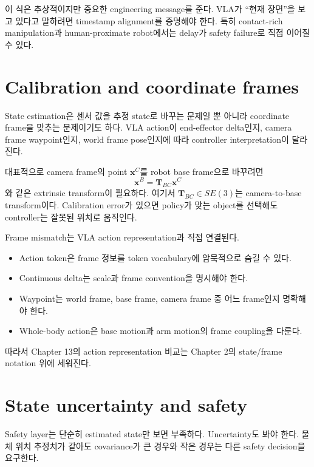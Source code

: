 이 식은 추상적이지만 중요한 engineering message를 준다. VLA가 ``현재 장면''을 보고 있다고 말하려면 timestamp alignment를 증명해야 한다. 특히 contact-rich manipulation과 human-proximate robot에서는 delay가 safety failure로 직접 이어질 수 있다.

\section{Calibration and coordinate frames}

State estimation은 센서 값을 추정 state로 바꾸는 문제일 뿐 아니라 coordinate frame을 맞추는 문제이기도 하다. VLA action이 end-effector delta인지, camera frame waypoint인지, world frame pose인지에 따라 controller interpretation이 달라진다.

대표적으로 camera frame의 point $\bm{x}^{C}$를 robot base frame으로 바꾸려면
\begin{equation}
  \bm{x}^{B} = \bm{T}_{BC}\bm{x}^{C}
  \label{eq:frame-transform}
\end{equation}
와 같은 extrinsic transform이 필요하다. 여기서 $\bm{T}_{BC}\in SE(3)$는 camera-to-base transform이다. Calibration error가 있으면 policy가 맞는 object를 선택해도 controller는 잘못된 위치로 움직인다.

Frame mismatch는 VLA action representation과 직접 연결된다.

\begin{itemize}
  \item Action token은 frame 정보를 token vocabulary에 암묵적으로 숨길 수 있다.
  \item Continuous delta는 scale과 frame convention을 명시해야 한다.
  \item Waypoint는 world frame, base frame, camera frame 중 어느 frame인지 명확해야 한다.
  \item Whole-body action은 base motion과 arm motion의 frame coupling을 다룬다.
\end{itemize}

따라서 Chapter 13의 action representation 비교는 Chapter 2의 state/frame notation 위에 세워진다.

\section{State uncertainty and safety}

Safety layer는 단순히 estimated state만 보면 부족하다. Uncertainty도 봐야 한다. 물체 위치 추정치가 같아도 covariance가 큰 경우와 작은 경우는 다른 safety decision을 요구한다.

